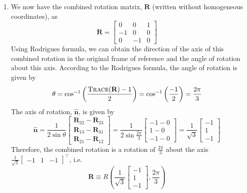 \documentclass[10pt]{article}
\newcommand{\unit}[1]{\mathbf{\hat{#1}}}
\begin{document}
\begin{enumerate}
        \item We now have the combined rotation matrix, $\mathbf{R}$ (written without homogeneous
        coordinates), as
        \begin{equation*}
            \mathbf{R} = \begin{bmatrix}
                0 & 0 & 1 \\
                -1 & 0 & 0 \\
                0 & -1 & 0
            \end{bmatrix}
        \end{equation*}
        Using Rodrigues formula, we can obtain the direction of the axis of this combined
        rotation in the original frame of reference and the angle of rotation about this axis.
        According to the Rodrigues formula, the angle of rotation is given by
        \begin{equation*}
            \theta = \cos^{-1}{\left(\frac{\textsc{Trace}(\mathbf{R}) - 1}{2}\right)}
            = \cos^{-1}{\left(\frac{-1}{2}\right)} = \frac{2\pi}{3}
        \end{equation*}
        The axis of rotation, $\unit{n}$, is given by
        \begin{equation*}
            \unit{n} = \frac{1}{2\sin{\theta}} \begin{bmatrix}
                \mathbf{R}_{32} - \mathbf{R}_{23} \\
                \mathbf{R}_{13} - \mathbf{R}_{31} \\
                \mathbf{R}_{21} - \mathbf{R}_{12}
            \end{bmatrix}
            = \frac{1}{2\sin{\frac{2\pi}{3}}} \begin{bmatrix}
                -1 - 0 \\
                1 - 0 \\
                -1 - 0
            \end{bmatrix} = \frac{1}{\sqrt{3}} \begin{bmatrix}
                -1 \\
                1 \\
                -1
            \end{bmatrix}
        \end{equation*}
        Therefore, the combined rotation is a rotation of $\frac{2\pi}{3}$ about the axis
        $\frac{1}{\sqrt{3}} \begin{bmatrix} -1 & 1 & -1 \end{bmatrix}^{\top}$,
        i.e.
        \begin{equation*}
            \mathbf{R} \equiv R\left(\frac{1}{\sqrt{3}} \begin{bmatrix}
                -1  \\
                1 \\
                -1
            \end{bmatrix}, \frac{2\pi}{3}\right)
        \end{equation*}


\end{enumerate}
\end{document}
